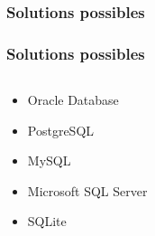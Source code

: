 \subsubsection{Solutions possibles}
\begin{frame}
\frametitle{Solutions possibles}
\begin{columns}
\begin{column}{5cm}
\begin{itemize}[<+->]
	\item<2-> Oracle Database
	\item<3-> PostgreSQL
	\item<4-> MySQL
	\item<5-> Microsoft SQL Server
	\item<6-> SQLite
\end{itemize}
\end{column}
\begin{column}{7cm}


\end{column}
\end{columns}
\end{frame}

